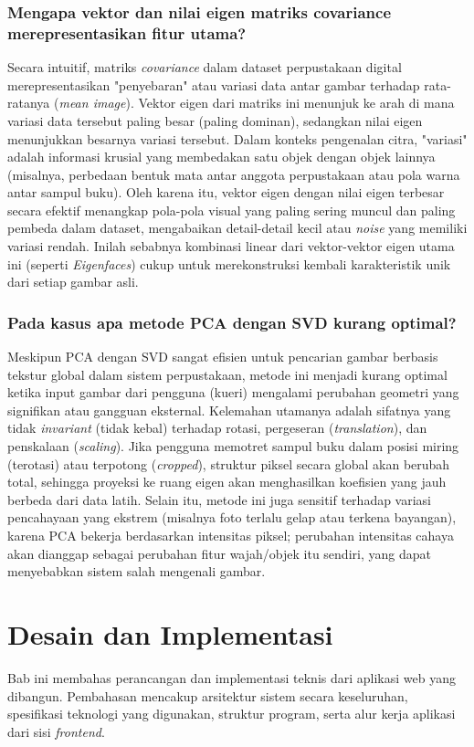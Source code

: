 \documentclass[12pt,a4paper]{article}
\begin{document}
\subsubsection{Mengapa vektor dan nilai eigen matriks covariance merepresentasikan fitur utama?}
Secara intuitif, matriks \textit{covariance} dalam dataset perpustakaan digital merepresentasikan "penyebaran" atau variasi data antar gambar terhadap rata-ratanya (\textit{mean image}). Vektor eigen dari matriks ini menunjuk ke arah di mana variasi data tersebut paling besar (paling dominan), sedangkan nilai eigen menunjukkan besarnya variasi tersebut. Dalam konteks pengenalan citra, "variasi" adalah informasi krusial yang membedakan satu objek dengan objek lainnya (misalnya, perbedaan bentuk mata antar anggota perpustakaan atau pola warna antar sampul buku). Oleh karena itu, vektor eigen dengan nilai eigen terbesar secara efektif menangkap pola-pola visual yang paling sering muncul dan paling pembeda dalam dataset, mengabaikan detail-detail kecil atau \textit{noise} yang memiliki variasi rendah. Inilah sebabnya kombinasi linear dari vektor-vektor eigen utama ini (seperti \textit{Eigenfaces}) cukup untuk merekonstruksi kembali karakteristik unik dari setiap gambar asli.

\subsubsection{Pada kasus apa metode PCA dengan SVD kurang optimal?}
Meskipun PCA dengan SVD sangat efisien untuk pencarian gambar berbasis tekstur global dalam sistem perpustakaan, metode ini menjadi kurang optimal ketika input gambar dari pengguna (kueri) mengalami perubahan geometri yang signifikan atau gangguan eksternal. Kelemahan utamanya adalah sifatnya yang tidak \textit{invariant} (tidak kebal) terhadap rotasi, pergeseran (\textit{translation}), dan penskalaan (\textit{scaling}). Jika pengguna memotret sampul buku dalam posisi miring (terotasi) atau terpotong (\textit{cropped}), struktur piksel secara global akan berubah total, sehingga proyeksi ke ruang eigen akan menghasilkan koefisien yang jauh berbeda dari data latih. Selain itu, metode ini juga sensitif terhadap variasi pencahayaan yang ekstrem (misalnya foto terlalu gelap atau terkena bayangan), karena PCA bekerja berdasarkan intensitas piksel; perubahan intensitas cahaya akan dianggap sebagai perubahan fitur wajah/objek itu sendiri, yang dapat menyebabkan sistem salah mengenali gambar.

\newpage
\section{Desain dan Implementasi}
Bab ini membahas perancangan dan implementasi teknis dari aplikasi web yang dibangun. Pembahasan mencakup arsitektur sistem secara keseluruhan, spesifikasi teknologi yang digunakan, struktur program, serta alur kerja aplikasi dari sisi \textit{frontend}.
\end{document}

